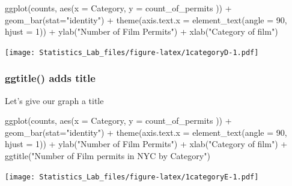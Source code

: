 \documentclass[
]{book}
\newenvironment{Shaded}{\begin{snugshade}}{\end{snugshade}}
\newcommand{\AttributeTok}[1]{\textcolor[rgb]{0.77,0.63,0.00}{#1}}
\newcommand{\DecValTok}[1]{\textcolor[rgb]{0.00,0.00,0.81}{#1}}
\newcommand{\FunctionTok}[1]{\textcolor[rgb]{0.00,0.00,0.00}{#1}}
\newcommand{\NormalTok}[1]{#1}
\newcommand{\SpecialCharTok}[1]{\textcolor[rgb]{0.00,0.00,0.00}{#1}}
\newcommand{\StringTok}[1]{\textcolor[rgb]{0.31,0.60,0.02}{#1}}
\begin{document}
\begin{Shaded}
\begin{Highlighting}[]
\FunctionTok{ggplot}\NormalTok{(counts, }\FunctionTok{aes}\NormalTok{(}\AttributeTok{x =}\NormalTok{ Category, }\AttributeTok{y =}\NormalTok{ count\_of\_permits )) }\SpecialCharTok{+}
  \FunctionTok{geom\_bar}\NormalTok{(}\AttributeTok{stat=}\StringTok{"identity"}\NormalTok{) }\SpecialCharTok{+} 
  \FunctionTok{theme}\NormalTok{(}\AttributeTok{axis.text.x =} \FunctionTok{element\_text}\NormalTok{(}\AttributeTok{angle =} \DecValTok{90}\NormalTok{, }\AttributeTok{hjust =} \DecValTok{1}\NormalTok{)) }\SpecialCharTok{+}
  \FunctionTok{ylab}\NormalTok{(}\StringTok{"Number of Film Permits"}\NormalTok{) }\SpecialCharTok{+} 
  \FunctionTok{xlab}\NormalTok{(}\StringTok{"Category of film"}\NormalTok{)}
\end{Highlighting}
\end{Shaded}

\texttt{[image: Statistics\_Lab\_files/figure-latex/1categoryD-1.pdf]}

\hypertarget{ggtitle-adds-title}{%
\subsubsection{ggtitle() adds title}\label{ggtitle-adds-title}}

Let's give our graph a title

\begin{Shaded}
\begin{Highlighting}[]
\FunctionTok{ggplot}\NormalTok{(counts, }\FunctionTok{aes}\NormalTok{(}\AttributeTok{x =}\NormalTok{ Category, }\AttributeTok{y =}\NormalTok{ count\_of\_permits )) }\SpecialCharTok{+}
  \FunctionTok{geom\_bar}\NormalTok{(}\AttributeTok{stat=}\StringTok{"identity"}\NormalTok{) }\SpecialCharTok{+} 
  \FunctionTok{theme}\NormalTok{(}\AttributeTok{axis.text.x =} \FunctionTok{element\_text}\NormalTok{(}\AttributeTok{angle =} \DecValTok{90}\NormalTok{, }\AttributeTok{hjust =} \DecValTok{1}\NormalTok{)) }\SpecialCharTok{+}
  \FunctionTok{ylab}\NormalTok{(}\StringTok{"Number of Film Permits"}\NormalTok{) }\SpecialCharTok{+} 
  \FunctionTok{xlab}\NormalTok{(}\StringTok{"Category of film"}\NormalTok{) }\SpecialCharTok{+}
  \FunctionTok{ggtitle}\NormalTok{(}\StringTok{"Number of Film permits in NYC by Category"}\NormalTok{)}
\end{Highlighting}
\end{Shaded}

\texttt{[image: Statistics\_Lab\_files/figure-latex/1categoryE-1.pdf]}
\end{document}

